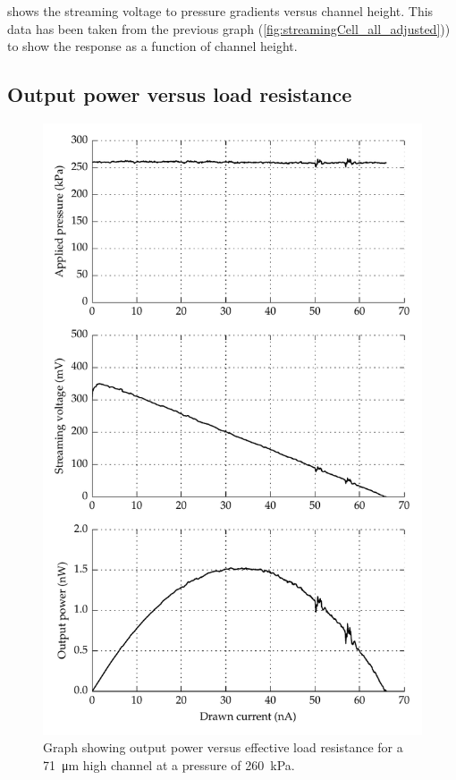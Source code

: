     shows the streaming voltage to pressure gradients versus channel height.
    This data has been taken from the previous graph (\cref{fig:streamingCell_all_adjusted})) to show the response as a function of channel height.



  \subsection{Output power versus load resistance}


    \begin{figure}
        \centering
        \includegraphics{content/pt1/01-PowerHarvesting/graphics/graph_streamingCell_outputPower_resistanceSweep}
        \caption{\label{fig:streamingCell_maxPower}Graph showing output power versus effective load resistance for a \SI{71}{\micro\metre} high channel at a pressure of \SI{260}{\kilo\pascal}.}
    \end{figure}

